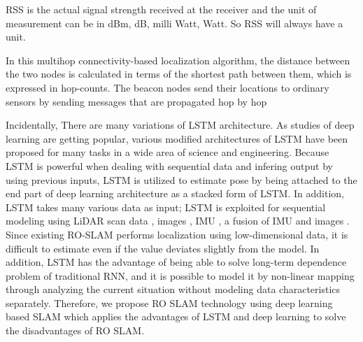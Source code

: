 \documentclass{ieeeaccess}
\begin{document}
RSS is the actual signal strength received at the receiver and the unit of measurement can be in dBm, dB, milli Watt, Watt. So RSS will always have a unit.

In this multihop connectivity-based localization algorithm,
the distance between the two nodes is calculated in terms of the
shortest path between them, which is expressed in hop-counts.
The beacon nodes send their locations to ordinary sensors by
sending messages that are propagated hop by hop





Incidentally, There are many variations of LSTM architecture. As studies of deep learning are getting popular, various modified architectures of LSTM have been proposed for many tasks in a wide area of science and engineering. Because LSTM is powerful when dealing with sequential data and infering output by using previous inputs, LSTM is utilized to estimate pose by being attached to the end part of deep learning architecture \cite{wang2017deepvo, kendall2015posenet, turan2018deep}  as a stacked form of LSTM. In addition, LSTM takes many various data as input; LSTM is exploited for sequential modeling using LiDAR scan data \cite{gladh2016deep}, images \cite{walch2017image, wang2017deepvo}, IMU \cite{ordonez2016deep}, a fusion of IMU and images \cite{clark2017vinet}. Since existing RO-SLAM performs localization using low-dimensional data, it is difficult to estimate even if the value deviates slightly from the model. In addition, LSTM has the advantage of being able to solve long-term dependence problem of traditional RNN, and it is possible to model it by non-linear mapping through analyzing the current situation without modeling data characteristics separately. Therefore, we propose RO SLAM technology using deep learning based SLAM which applies the advantages of LSTM and deep learning to solve the disadvantages of RO SLAM.
\end{document}
